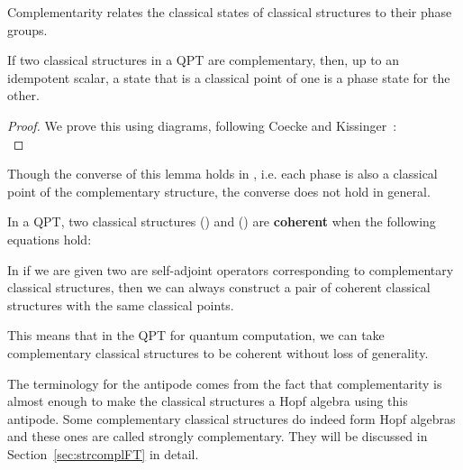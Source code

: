 Complementarity relates the classical states of classical structures to their phase groups.
\begin{lemma}
\label{lem:phaseunbiased}
If two classical structures in a QPT are complementary, then, up to an idempotent scalar, a state that is a classical point of one is a phase state for the other.
\end{lemma}
\begin{proof}
We prove this using diagrams, following Coecke and Kissinger~\cite{qcs-notes}:
\begin{equation}

\end{equation}
\end{proof}
Though the converse of this lemma holds in , i.e. each phase is also a classical point of the complementary structure, the converse does not hold in general.

%

\begin{defn}\label{def:coherence}
In a QPT, two classical structures () and () are \textbf{coherent} when the following equations hold:
\begin{equation}
\label{eq:coherence}
 
\end{equation}
\end{defn}

\begin{proposition}
\label{prop:cohere}
In  if we are given two are self-adjoint operators corresponding to complementary classical structures, then we can always construct a pair of coherent classical structures with the same classical points.
\end{proposition}
\noindent This means that in the QPT for quantum computation, we can take complementary classical structures to be coherent without loss of generality.

The terminology for the antipode comes from the fact that complementarity is almost enough to make the classical structures a Hopf algebra using this antipode. Some complementary classical structures do indeed form Hopf algebras and these ones are called strongly complementary. They will be discussed in Section~\ref{sec:strcomplFT} in detail.

